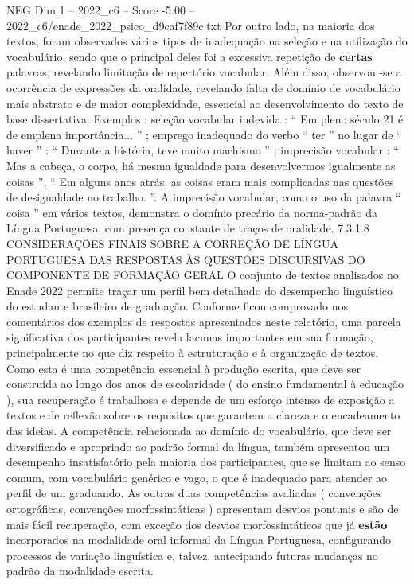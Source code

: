 \begin{textsample}{NEG Dim 1 – 2022\_c6 – Score -5.00 – 2022\_c6/enade\_2022\_psico\_d9caf7f89c.txt}
Por outro lado, na maioria dos textos, foram observados vários tipos de inadequação na seleção e na utilização do vocabulário, sendo que o principal deles foi a excessiva repetição de \textbf{certas} palavras, revelando limitação de repertório vocabular.
Além disso, observou -se a ocorrência de expressões da oralidade, revelando falta de domínio de vocabulário mais abstrato e de maior complexidade, essencial ao desenvolvimento do texto de base dissertativa.
Exemplos : seleção vocabular indevida : “ Em pleno século 21 é de emplena importância... ” ; emprego inadequado do verbo “ ter ” no lugar de “ haver ” : “ Durante a história, teve muito machismo ” ; imprecisão vocabular : “ Mas a cabeça, o corpo, há mesma igualdade para desenvolvermos igualmente as coisas ”, “ Em alguns anos atrás, as coisas eram mais complicadas nas questões de desigualdade no trabalho. ”.
A imprecisão vocabular, como o uso da palavra “ coisa ” em vários textos, demonstra o domínio precário da norma-padrão da Língua Portuguesa, com presença constante de traços de oralidade. 7.3.1.8 CONSIDERAÇÕES FINAIS SOBRE A CORREÇÃO DE LÍNGUA PORTUGUESA DAS RESPOSTAS ÀS QUESTÕES DISCURSIVAS DO COMPONENTE DE FORMAÇÃO GERAL O conjunto de textos analisados no Enade 2022 permite traçar um perfil bem detalhado do desempenho linguístico do estudante brasileiro de graduação.
Conforme ficou comprovado nos comentários dos exemplos de respostas apresentados neste relatório, uma parcela significativa dos participantes revela lacunas importantes em sua formação, principalmente no que diz respeito à estruturação e à organização de textos.
Como esta é uma competência essencial à produção escrita, que deve ser construída ao longo dos anos de escolaridade ( do ensino fundamental à educação ), sua recuperação é trabalhosa e depende de um esforço intenso de exposição a textos e de reflexão sobre os requisitos que garantem a clareza e o encadeamento das ideias.
A competência relacionada ao domínio do vocabulário, que deve ser diversificado e apropriado ao padrão formal da língua, também apresentou um desempenho insatisfatório pela maioria dos participantes, que se limitam ao senso comum, com vocabulário genérico e vago, o que é inadequado para atender ao perfil de um graduando.
As outras duas competências avaliadas ( convenções ortográficas, convenções morfossintáticas ) apresentam desvios pontuais e são de mais fácil recuperação, com exceção dos desvios morfossintáticos que já \textbf{estão} incorporados na modalidade oral informal da Língua Portuguesa, configurando processos de variação linguística e, talvez, antecipando futuras mudanças no padrão da modalidade escrita.

\end{textsample}
